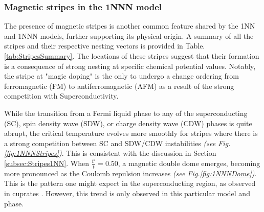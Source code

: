 \documentclass[12pt]{article}
\begin{document}
\subsubsection{Magnetic stripes in the 1NNN model}
\label{subsec:Stripes1NNN}

The presence of magnetic stripes is another common feature shared by the 1NN and 1NNN models, 
further supporting its physical origin.
A summary of all the stripes and their respective nesting vectors is provided 
in Table.\ref{tab:StripesSummary}. The locations of these
stripes suggest that their formation is a consequence of strong nesting at specific 
chemical potential values. 
Notably, the stripe at "magic doping" is the only to undergo a change ordering from ferromagnetic (FM) 
to antiferromagnetic (AFM) as a result of the strong competition with Superconductivity. 



\medskip 

\noindent While the transition from a Fermi liquid phase to any of the superconducting (SC), spin density wave (SDW), or charge density wave (CDW) phases is quite abrupt, the critical temperature
evolves more smoothly for stripes where there is a strong competition between SC and SDW/CDW instabilities \textit{(see Fig.\ref{fig:1NNNStripes})}. 
This is consistent with the discussion in Section \ref{subsec:Stripes1NN}. When $\frac{t'}{t} = 0.50$, a magnetic double dome emerges, becoming more pronounced as the Coulomb repulsion increases \textit{(see Fig.\ref{fig:1NNNDome})}. 
This is the pattern one might expect in the superconducting region, as observed in cuprates \cite{taillefer2010scattering}. 
However, this trend is only observed in this particular model and phase.
\end{document}
